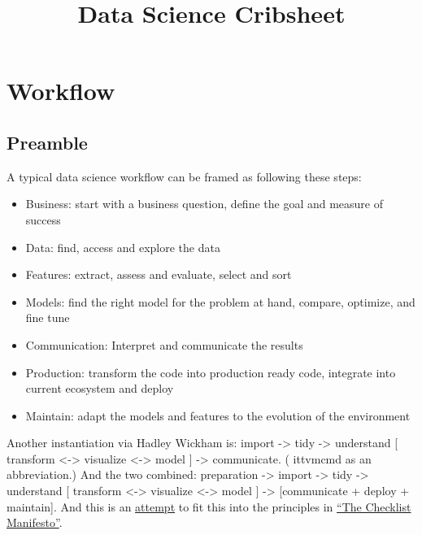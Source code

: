\documentclass[]{book}
\title{Data Science Cribsheet}
\author{}
\date{}
\begin{document}
\maketitle

{
\setcounter{tocdepth}{1}
\tableofcontents
}
\hypertarget{workflow}{%
\chapter{Workflow}\label{workflow}}

\hypertarget{preamble}{%
\section{Preamble}\label{preamble}}

A typical data science workflow can be framed as following these steps:

\begin{itemize}
\item
  Business: start with a business question, define the goal and measure of success
\item
  Data: find, access and explore the data
\item
  Features: extract, assess and evaluate, select and sort
\item
  Models: find the right model for the problem at hand, compare, optimize, and fine tune
\item
  Communication: Interpret and communicate the results
\item
  Production: transform the code into production ready code, integrate into current ecosystem and deploy
\item
  Maintain: adapt the models and features to the evolution of the environment
\end{itemize}

Another instantiation via Hadley Wickham is: import -\textgreater{} tidy -\textgreater{} understand {[} transform \textless{}-\textgreater{} visualize \textless{}-\textgreater{} model {]} -\textgreater{} communicate. ( ittvmcmd as an abbreviation.) And the two combined: preparation -\textgreater{} import -\textgreater{} tidy -\textgreater{} understand {[} transform \textless{}-\textgreater{} visualize \textless{}-\textgreater{} model {]} -\textgreater{} {[}communicate + deploy + maintain{]}. And this is an \href{https://gist.github.com/gfleetwood/3c152bee44d03a00fa5e8df3210a9918}{attempt} to fit this into the principles in \href{https://www.amazon.com/dp/B0030V0PEW/ref=dp-kindle-redirect?_encoding=UTF8\&btkr=1}{``The Checklist Manifesto''}.
\end{document}
